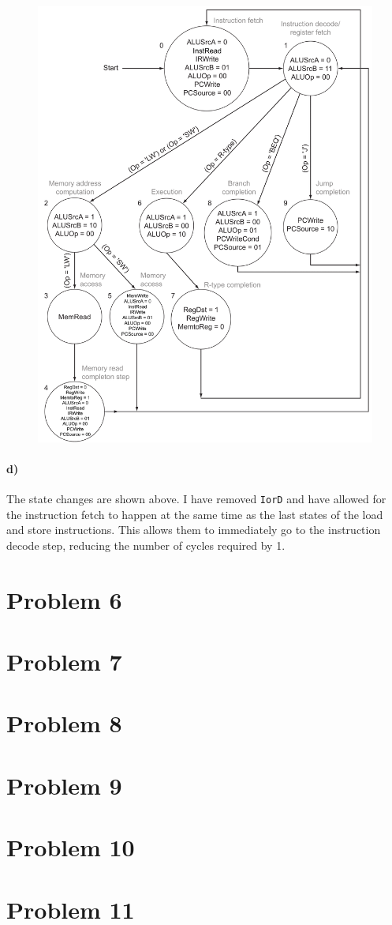 \documentclass[12pt]{article}
\begin{document}
\begin{figure}[!ht]
    \begin{center}
        \includegraphics[width=4.7in]{problem5d.png}
    \end{center}
\end{figure}

\paragraph{d)}

The state changes are shown above. I have removed \texttt{IorD} and have allowed for the instruction fetch to happen at the same time as the last states
of the load and store instructions. This allows them to immediately go to the instruction decode step, reducing the number of cycles required by 1.

\section*{Problem 6}

\section*{Problem 7}

\section*{Problem 8}

\section*{Problem 9}

\section*{Problem 10}

\section*{Problem 11}
\end{document}
